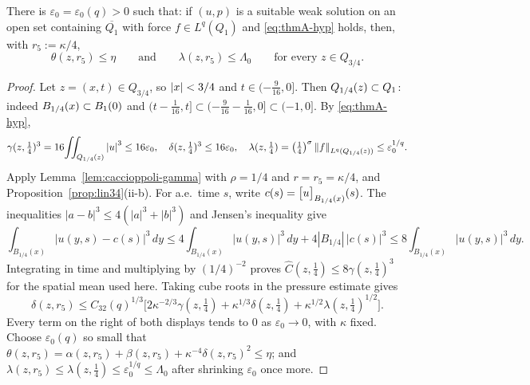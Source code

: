 \documentclass[11pt,reqno]{amsart}
\begin{document}
\begin{lemma}\label{lem:thmA-start}
There is $\varepsilon_{0}=\varepsilon_{0}(q)>0$ such that: if $(u,p)$ is a
suitable weak solution on an open set containing $\overline{Q_{1}}$ with force
$f\in L^{q}(Q_{1})$ and \eqref{eq:thmA-hyp} holds, then, with
$r_{5}:=\kappa/4$,
\[
  \theta(z,r_{5})\le\eta
  \qquad\text{and}\qquad
  \lambda(z,r_{5})\le\Lambda_{0}
  \qquad\text{for every }z\in Q_{3/4}.
\]
\end{lemma}

\begin{proof}
Let $z=(x,t)\in Q_{3/4}$, so $\left\lvert x \right\rvert<3/4$ and $t\in(-\tfrac9{16},0]$. Then
$Q_{1/4}(z)\subset Q_{1}$: indeed $B_{1/4}(x)\subset B_{1}(0)$ and
$(t-\tfrac1{16},t]\subset(-\tfrac9{16}-\tfrac1{16},0]\subset(-1,0]$. By
\eqref{eq:thmA-hyp},
\[
  \gamma(z,\tfrac14)^{3}=16\!\iint_{Q_{1/4}(z)}\left\lvert u \right\rvert^{3}\le16\varepsilon_{0},
  \quad
  \delta(z,\tfrac14)^{3}\le16\varepsilon_{0},
  \quad
  \lambda(z,\tfrac14)=\bigl(\tfrac14\bigr)^{\sigma}\left\lVert f \right\rVert_{L^{q}(Q_{1/4}(z))}
    \le\varepsilon_{0}^{1/q}.
\]
Apply Lemma~\ref{lem:caccioppoli-gamma} with $\rho=1/4$ and $r=r_{5}=\kappa/4$,
and Proposition~\ref{prop:lin34}(ii-b). For a.e.\ time $s$, write
$c(s)=\bigl[u\bigr]_{B_{1/4}(x)}(s)$. The inequalities
$|a-b|^3\le4(|a|^3+|b|^3)$ and Jensen's inequality give
\[
 \int_{B_{1/4}(x)}|u(y,s)-c(s)|^3\,dy
 \le4\int_{B_{1/4}(x)}|u(y,s)|^3\,dy+4|B_{1/4}|\,|c(s)|^3
 \le8\int_{B_{1/4}(x)}|u(y,s)|^3\,dy.
\]
Integrating in time and multiplying by $(1/4)^{-2}$ proves
$\widehat C(z,\tfrac14)\le8\gamma(z,\tfrac14)^3$ for the spatial mean
used here. Taking cube roots in the pressure estimate gives
\[
  \delta(z,r_{5})\le C_{32}(q)^{1/3}\bigl[2\kappa^{-2/3}\gamma(z,\tfrac14)
    +\kappa^{1/3}\delta(z,\tfrac14)+\kappa^{1/2}\lambda(z,\tfrac14)^{1/2}\bigr].
\]
Every term on the right of both displays tends to $0$ as
$\varepsilon_{0}\to0$, with $\kappa$ fixed. Choose $\varepsilon_{0}(q)$ so small
that $\theta(z,r_{5})=\alpha(z,r_{5})+\beta(z,r_{5})+\kappa^{-4}\delta(z,r_{5})^{2}
\le\eta$; and $\lambda(z,r_{5})\le\lambda(z,\tfrac14)\le\varepsilon_{0}^{1/q}
\le\Lambda_{0}$ after shrinking $\varepsilon_{0}$ once more.
\end{proof}
\end{document}
